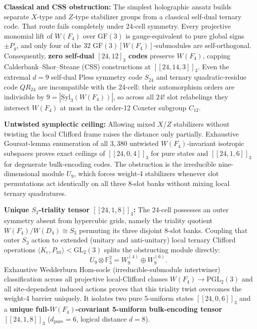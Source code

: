 \textbf{Classical and CSS obstruction:} The simplest holographic ansatz builds separate $X$-type and $Z$-type stabilizer
groups from a classical self-dual ternary code. That route fails completely under 24-cell symmetry. Every projective
monomial lift of $W(F_4)$ over $\mathrm{GF}(3)$ is gauge-equivalent to pure global signs $\pm P_g$, and only four of the
$32$ $\mathrm{GF}(3)[W(F_4)]$-submodules are self-orthogonal. Consequently, \textbf{zero self-dual $[24, 12]_3$ codes}
preserve $W(F_4)$, capping Calderbank--Shor--Steane (CSS) constructions at $[[24, 14, 3]]_3$. Even the extremal $d = 9$
self-dual Pless symmetry code $S_{24}$ \cite{pless1968} and ternary quadratic-residue code $QR_{24}$ are incompatible
with the 24-cell: their automorphism orders are indivisible by $9 = |\mathrm{Syl}_3(W(F_4))|$, so across all $24!$ slot
relabelings they intersect $W(F_4)$ at most in the order-12 Coxeter subgroup $C_{12}$.

\textbf{Untwisted symplectic ceiling:} Allowing mixed $X$/$Z$ stabilizers without twisting the local Clifford frame
raises the distance only partially. Exhaustive Goursat-lemma enumeration of all $3{,}380$ untwisted $W(F_4)$-invariant
isotropic subspaces proves exact ceilings of $[[24, 0, 4]]_3$ for pure states and $[[24, 1, 6]]_3$ for degenerate
bulk-encoding codes. The obstruction is the irreducible nine-dimensional module $U_9$, which forces weight-4 stabilizers
whenever slot permutations act identically on all three 8-slot banks without mixing local ternary quadratures.

\textbf{Unique $S_3$-triality tensor $[[24, 1, 8]]_3$:} The 24-cell possesses an outer symmetry absent from hypercubic
grids, namely the triality quotient $W(F_4) / W(D_4) \cong S_3$ permuting its three disjoint 8-slot banks. Coupling that
outer $S_3$ action to extended (unitary and anti-unitary) local ternary Clifford operations
$\langle K_{\mathrm{c}}, P_{\mathrm{tri}} \rangle < \mathrm{GL}_2(3)$ splits the obstructing module directly:
\begin{equation}
U_9 \otimes \mathbb{F}_3^2 = W_9^{(4)} \oplus W_9^{(6)}.
\label{eq:triality-split}
\end{equation}
Exhaustive Wedderburn Hom-socle (irreducible-submodule intertwiner) classification across all projective local-Clifford
classes $W(F_4) \to \mathrm{PGL}_2(3)$ and all site-dependent induced actions proves that this triality twist overcomes
the weight-4 barrier uniquely. It isolates two pure 5-uniform states $[[24, 0, 6]]_3$ and a \textbf{unique
full-$W(F_4)$-covariant 5-uniform bulk-encoding tensor $[[24, 1, 8]]_3$} ($d_{\mathrm{pure}} = 6$, logical distance
$d = 8$).

